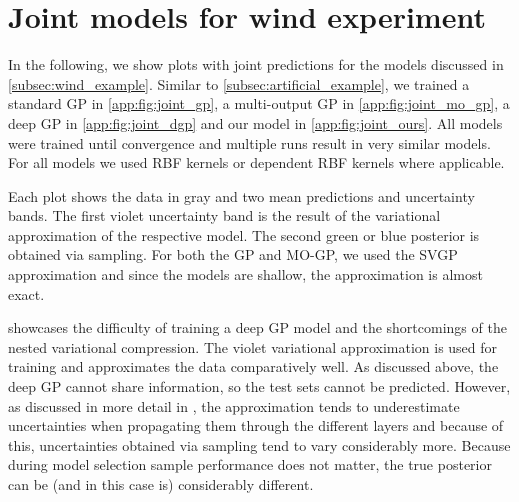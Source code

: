\documentclass{article}
\begin{document}


\section{Joint models for wind experiment}
\label{app:sec:joint_models}
In the following, we show plots with joint predictions for the models discussed in \cref{subsec:wind_example}.
Similar to \cref{subsec:artificial_example}, we trained a standard GP in \cref{app:fig:joint_gp}, a multi-output GP in \cref{app:fig:joint_mo_gp}, a deep GP in \cref{app:fig:joint_dgp} and our model in \cref{app:fig:joint_ours}.
All models were trained until convergence and multiple runs result in very similar models.
For all models we used RBF kernels or dependent RBF kernels where applicable.

Each plot shows the data in gray and two mean predictions and uncertainty bands.
The first violet uncertainty band is the result of the variational approximation of the respective model.
The second green or blue posterior is obtained via sampling.
For both the GP and MO-GP, we used the SVGP approximation \parencite{hensman_scalable_2014} and since the models are shallow, the approximation is almost exact.

 showcases the difficulty of training a deep GP model and the shortcomings of the nested variational compression.
The violet variational approximation is used for training and approximates the data comparatively well.
As discussed above, the deep GP cannot share information, so the test sets cannot be predicted.
However, as discussed in more detail in \parencite{hensman_scalable_2014}, the approximation tends to underestimate uncertainties when propagating them through the different layers and because of this, uncertainties obtained via sampling tend to vary considerably more.
Because during model selection sample performance does not matter, the true posterior can be (and in this case is) considerably different.
\end{document}
